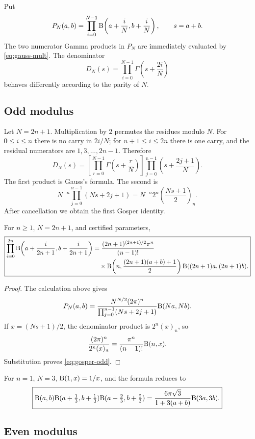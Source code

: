 Put
\[
 P_N(a,b)=\prod_{i=0}^{N-1}
 \mathrm B\!\left(a+\frac iN,b+\frac iN\right),
 \qquad s=a+b.
\]
The two numerator Gamma products in $P_N$ are immediately evaluated by \eqref{eq:gauss-mult}.  The denominator
\[
 D_N(s)=\prod_{i=0}^{N-1}\Gamma\!\left(s+\frac{2i}{N}\right)
\]
behaves differently according to the parity of $N$.

\subsection{Odd modulus}

Let $N=2n+1$.  Multiplication by $2$ permutes the residues modulo $N$.  For $0\le i\le n$ there is no carry in $2i/N$; for $n+1\le i\le2n$ there is one carry, and the residual numerators are $1,3,\dots,2n-1$.  Therefore
\[
 D_N(s)=
 \left[\prod_{r=0}^{N-1}\Gamma\!\left(s+\frac rN\right)\right]
 \prod_{j=0}^{n-1}\left(s+\frac{2j+1}{N}\right).
\]
The first product is Gauss's formula.  The second is
\[
 N^{-n}\prod_{j=0}^{n-1}(Ns+2j+1)
 =N^{-n}2^n\left(\frac{Ns+1}{2}\right)_n.
\]
After cancellation we obtain the first Gosper identity.

\begin{theorem}\label{thm:gosper-odd}
For $n\ge1$, $N=2n+1$, and certified parameters,
\begin{equation}
 \boxed{\begin{aligned}
 \prod_{i=0}^{2n}
 \mathrm B\!\left(a+\frac{i}{2n+1},b+\frac{i}{2n+1}\right)
 &=\frac{(2n+1)^{(2n+1)/2}\pi^n}{(n-1)!}\\[-1mm]
 &\quad{}\times
 \mathrm B\!\left(n,\frac{(2n+1)(a+b)+1}{2}\right)
 \mathrm B((2n+1)a,(2n+1)b).
 \end{aligned}}
 \label{eq:gosper-odd}
\end{equation}
\end{theorem}

\begin{proof}
The calculation above gives
\[
 P_N(a,b)=
 \frac{N^{N/2}(2\pi)^n}{\prod_{j=0}^{n-1}(Ns+2j+1)}
 \mathrm B(Na,Nb).
\]
If $x=(Ns+1)/2$, the denominator product is $2^n(x)_n$, so
\[
 \frac{(2\pi)^n}{2^n(x)_n}
 =\frac{\pi^n}{(n-1)!}\mathrm B(n,x).
\]
Substitution proves \eqref{eq:gosper-odd}.
\end{proof}

For $n=1$, $N=3$, $\mathrm B(1,x)=1/x$, and the formula reduces to
\[
 \boxed{
 \mathrm B(a,b)\mathrm B(a+\tfrac13,b+\tfrac13)
 \mathrm B(a+\tfrac23,b+\tfrac23)
 =
 \frac{6\pi\sqrt3}{1+3(a+b)}\mathrm B(3a,3b).}
\]

\subsection{Even modulus}

